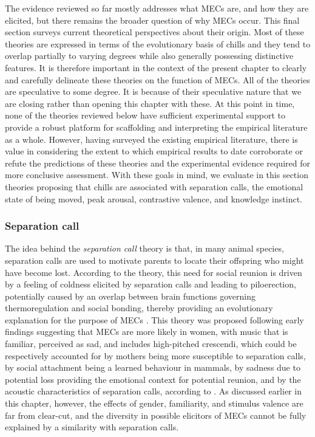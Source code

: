 The evidence reviewed so far mostly addresses what MECs are, and how they are elicited, but there remains the broader question of why MECs occur. This final section surveys current theoretical perspectives about their origin. Most of these theories are expressed in terms of the evolutionary basis of chills and they tend to overlap partially to varying degrees while also generally possessing distinctive features. It is therefore important in the context of the present chapter to clearly and carefully delineate these theories on the function of MECs. All of the theories are speculative to some degree. It is because of their speculative nature that we are closing rather than opening this chapter with these. At this point in time, none of the theories reviewed below have sufficient experimental support to provide a robust platform for scaffolding and interpreting the empirical literature as a whole. However, having surveyed the existing empirical literature, there is value in considering the extent to which empirical results to date corroborate or refute the predictions of these theories and the experimental evidence required for more conclusive assessment. With these goals in mind, we evaluate in this section theories proposing that chills are associated with separation calls, the emotional state of being moved, peak arousal, contrastive valence, and knowledge instinct.

\subsubsection{Separation call}

The idea behind the \emph{separation call} theory is that, in many animal species, separation calls are used to motivate parents to locate their offspring who might have become lost. According to the theory, this need for social reunion is driven by a feeling of coldness elicited by separation calls and leading to piloerection, potentially caused by an overlap between brain functions governing thermoregulation and social bonding, thereby providing an evolutionary explanation for the purpose of MECs \parencite{panksepp1995, panksepp2002, panksepp2009}. This theory was proposed following early findings suggesting that MECs are more likely in women, with music that is familiar, perceived as sad, and includes high-pitched crescendi, which could be respectively accounted for by mothers being more susceptible to separation calls, by social attachment being a learned behaviour in mammals, by sadness due to potential loss providing the emotional context for potential reunion, and by the acoustic characteristics of separation calls, according to \textcite{panksepp1995}. As discussed earlier in this chapter, however, the effects of gender, familiarity, and stimulus valence are far from clear-cut, and the diversity in possible elicitors of MECs cannot be fully explained by a similarity with separation calls.

